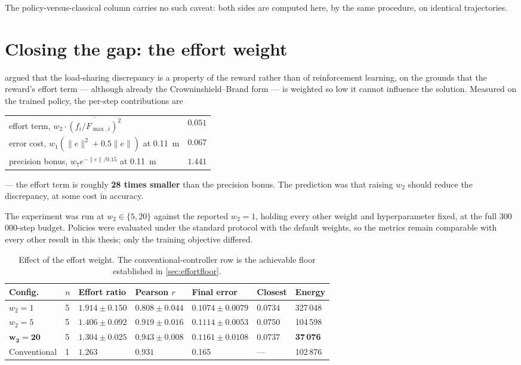 The policy-versus-classical column carries no such caveat: both sides are
computed here, by the same procedure, on identical trajectories.

\section{Closing the gap: the effort weight}
\label{sec:effortsweep}

 argued that the load-sharing discrepancy is a property of the
reward rather than of reinforcement learning, on the grounds that the reward's
effort term --- although already the Crowninshield--Brand form --- is weighted so
low it cannot influence the solution. Measured on the trained policy, the
per-step contributions are

\begin{center}
\begin{tabular}{@{} L{7.0cm} R{3.0cm} @{}}
\toprule
effort term, $w_2 \cdot \overline{(f_i/F_{\max,i})^2}$ & $0.051$ \\
error cost, $w_1 (\|e\|^2 + 0.5\|e\|)$ at \SI{0.11}{\meter} & $0.067$ \\
precision bonus, $w_7 e^{-\|e\|/0.15}$ at \SI{0.11}{\meter} & $1.441$ \\
\bottomrule
\end{tabular}
\end{center}

--- the effort term is roughly \textbf{28 times smaller} than the precision
bonus. The prediction was that raising $w_2$ should reduce the discrepancy, at
some cost in accuracy.

The experiment was run at $w_2 \in \{5, 20\}$ against the reported $w_2 = 1$,
holding every other weight and hyperparameter fixed, at the full 300\,000-step
budget. Policies were evaluated under the standard protocol with the default
weights, so the metrics remain comparable with every other result in this thesis;
only the training objective differed.

\begin{table}[H]
\centering
\caption{Effect of the effort weight. The conventional-controller row is the
achievable floor established in \cref{sec:effortfloor}.}
\begin{tabular}{@{} L{3.0cm} C{0.9cm} C{2.5cm} C{2.4cm} C{2.4cm} C{2.2cm} C{1.6cm} @{}}
\toprule
\textbf{Config.} & \textbf{$n$} & \textbf{Effort ratio} & \textbf{Pearson $r$} & \textbf{Final error} & \textbf{Closest} & \textbf{Energy} \\
\midrule
$w_2 = 1$  & 5 & $1.914 \pm 0.150$ & $0.808 \pm 0.044$ & $0.1074 \pm 0.0079$ & $0.0734$ & 327\,048 \\
$w_2 = 5$  & 5 & $1.406 \pm 0.092$ & $0.919 \pm 0.016$ & $0.1114 \pm 0.0053$ & $0.0750$ & 104\,598 \\
$\mathbf{w_2 = 20}$ & 5 & $\mathbf{1.304 \pm 0.025}$ & $\mathbf{0.943 \pm 0.008}$ & $0.1161 \pm 0.0108$ & $0.0737$ & \textbf{37\,076} \\
\midrule
Conventional & 1 & $1.263$ & $0.931$ & 0.165 & --- & 102\,876 \\
\bottomrule
\end{tabular}
\label{tab:effortsweep}
\end{table}

